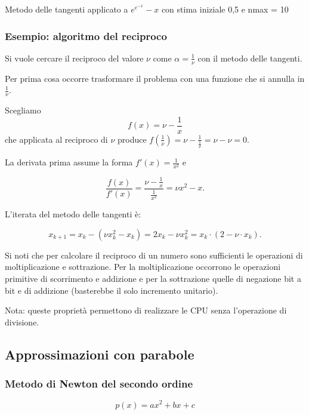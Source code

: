 \documentclass[10pt]{article}
\begin{document}
\begin{table}
    \begin{center}
    \end{center}        
    \caption[]{Metodo delle tangenti applicato a $e^{e^{-x}}-x$ con stima iniziale 0,5 e nmax = 10}
\end{table}

\subsubsection{Esempio: algoritmo del reciproco}

Si vuole cercare il reciproco del valore $\nu$ come $\alpha = \frac{1}{\nu}$ con il metodo delle tangenti.

Per prima cosa occorre trasformare il problema con una funzione che si annulla in $\frac{1}{\nu}$.

Scegliamo $$f(x) = \nu - \frac{1}{x}$$ che applicata al reciproco di $\nu$ produce
$f(\frac{1}{\nu}) = \nu - \frac{1}{\frac{1}{\nu}} = \nu - \nu = 0$. 

La derivata prima assume la forma $f'(x) = \frac{1}{x^2}$ e

$$\frac{f(x)}{f'(x)} = \frac{\nu - \frac{1}{x}}{\frac{1}{x^2}} = \nu x^2 - x.$$

L'iterata del metodo delle tangenti è:

$$x_{k+1} = x_k - (\nu x_k^2 - x_k) = 2 x_k - \nu x_k^2  = x_k \cdot (2 - \nu \cdot x_k).$$

Si noti che per calcolare il reciproco di un numero sono sufficienti le operazioni di moltiplicazione e sottrazione.
Per la moltiplicazione occorrono le operazioni primitive di scorrimento e addizione e per la sottrazione quelle di negazione bit a bit e di addizione (basterebbe il solo incremento unitario).

Nota: queste proprietà permettono di realizzare le CPU senza l'operazione di divisione.

\subsection{Approssimazioni con parabole}

\subsubsection{Metodo di Newton del secondo ordine}



\begin{equation}
    p (x) = a x^2 + b x + c
\end{equation}
\end{document}
